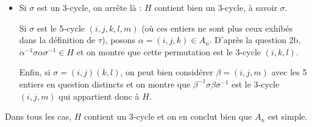 \begin{enumerate}[1)]
\begin{enumerate}
\begin{itemize}[$\bullet$]
           \item Si $\sigma$ est un 3-cycle, on arrête là : $H$ contient bien un 3-cycle, à savoir $\sigma$.

           Si $\sigma$ est le 5-cycle $(i,j,k,l, m)$ (où ces entiers ne sont plus ceux exhibés dans la définition de $\tau$), posons $\alpha = (i,j,k) \in A_n$. D'après la question 2b, $\alpha^{-1} \sigma \alpha \sigma^{-1} \in H$ et on montre que cette permutation est le 3-cycle $(i,k,l)$.

           Enfin, si $\sigma = (i,j)(k,l)$, on peut bien considérer $\beta = (i,j,m)$ avec les 5 entiers en question distincts et on montre que $\beta^{-1} \sigma \beta \sigma^{-1}$ est le 3-cycle $(i,j,m)$ qui appartient donc à $H$.
           \end{itemize}
    Dans tous les cas, $H$ contient un 3-cycle et on en conclut bien que $A_n$ est simple.
    \end{enumerate}

\end{enumerate}
